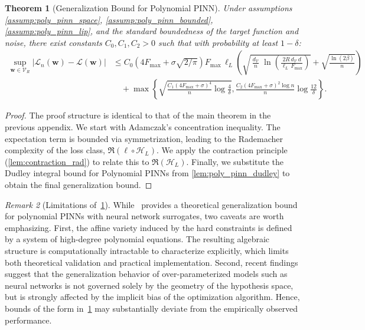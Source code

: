 \documentclass{article}
\theoremstyle{plain}
\newtheorem{theorem}{Theorem}[section]
\theoremstyle{definition}
\theoremstyle{remark}
\newtheorem{remark}[theorem]{Remark}
\begin{document}
\begin{theorem}[Generalization Bound for Polynomial PINN]
\label{thm:poly_pinn_gen_bound}
Under assumptions \ref{assump:poly_pinn_space}, \ref{assump:poly_pinn_bounded}, \ref{assump:poly_pinn_lip}, and the standard boundedness of the target function and noise, there exist constants $C_0, C_1, C_2 > 0$ such that with probability at least $1-\delta$:
\begin{align*}
    \sup_{\bm{w} \in \mathcal{V}_R} |\mathcal{L}_n(\bm{w}) - \mathcal{L}(\bm{w})| &\le C_0 \left(4F_{\max} + \sigma\sqrt{2/\pi}\right) F_{\max}\,\ell_L
\left(
\sqrt{\,\frac{d_{\mathcal{V}}}{n}\;\ln\left(\frac{2R\,d_{\mathcal{V}}\,d}{\ell_L\,F_{\max}}\right)}
+\sqrt{\frac{\ln(2\beta)}{n}}
\right) \\
    &\quad + \max\left\{ \sqrt{\frac{C_1(4F_{\max}+\sigma)^4}{n} \log\frac{4}{\delta}}, \frac{C_2(4F_{\max}+\sigma)^2 \log n}{n} \log\frac{12}{\delta} \right\}.
\end{align*}
\end{theorem}

\begin{proof}
The proof structure is identical to that of the main theorem in the previous appendix. We start with Adamczak's concentration inequality. The expectation term is bounded via symmetrization, leading to the Rademacher complexity of the loss class, $\mathfrak{R}(\ell \circ \mathcal{H}_L)$. We apply the contraction principle (\cref{lem:contraction_rad}) to relate this to $\mathfrak{R}(\mathcal{H}_L)$. Finally, we substitute the Dudley integral bound for Polynomial PINNs from \cref{lem:poly_pinn_dudley} to obtain the final generalization bound.
\end{proof}

\begin{remark}[Limitations of~\cref{thm:poly_pinn_gen_bound}]
While~ provides a theoretical generalization bound for
polynomial PINNs with neural network surrogates, two caveats are worth
emphasizing.  
First, the affine variety induced by the hard constraints is defined by
a system of high-degree polynomial equations.  The resulting algebraic
structure is computationally intractable to characterize explicitly,
which limits both theoretical validation and practical implementation.  
Second, recent findings suggest that the generalization behavior of
over-parameterized models such as neural networks is not governed solely
by the geometry of the hypothesis space, but is strongly affected by the
implicit bias of the optimization algorithm.  Hence, bounds of the form
in~\cref{thm:poly_pinn_gen_bound} may substantially deviate from the empirically observed performance.
\end{remark}
\end{document}
